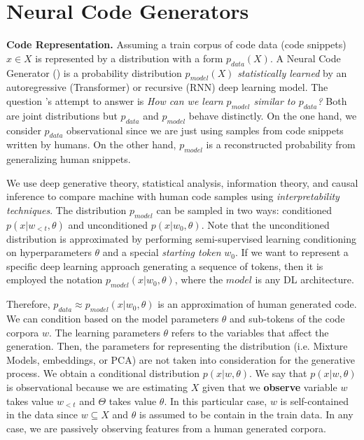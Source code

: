 \section{Neural Code Generators}
\label{sec:ncg}

\textbf{Code Representation.} Assuming a train corpus of code data (\eg code snippets) $x \in X$ is represented by a distribution with a form $p_{data}(X)$. A Neural Code Generator (\ncg) is a probability distribution $p_{model}(X)$ \textit{statistically learned} by an autoregressive (\ie Transformer) or recursive (\ie RNN) deep learning model. The question \ncg's attempt to answer is \textit{How can we learn $p_{model}$ similar to $p_{data}$?} Both are joint distributions but $p_{data}$ and $p_{model}$ behave distinctly. On the one hand, we consider $p_{data}$ observational since we are just using samples from code snippets written by humans. On the other hand, $p_{model}$ is a reconstructed probability from generalizing human snippets. 

We use deep generative theory, statistical analysis, information theory, and causal inference to compare machine with human code samples using \textit{interpretability techniques}. The distribution $p_{model}$ can be sampled in two ways: conditioned $p(x|w_{<t},\theta)$ and unconditioned  $p(x|w_0,\theta)$. Note that the unconditioned distribution is approximated by performing semi-supervised learning conditioning on hyperparameters $\theta$ and a special \textit{starting token} $w_0$. If we want to represent a specific deep learning approach generating a sequence of tokens, then it is employed the notation $p_{model}(x|w_0, \theta)$, where the $model$ is any DL architecture. 

Therefore, $p_{data} \approx p_{model}(x|w_0, \theta)$ is an approximation of human generated code. We can condition based on the model parameters $\theta$ and sub-tokens of the code corpora $w$. The learning parameters $\theta$ refers to the variables that affect the generation. Then, the parameters for representing the distribution (i.e. Mixture Models, embeddings, or PCA) are not taken into consideration for the generative process. We obtain a conditional distribution $p(x|w,\theta)$. We say that $p(x|w,\theta)$ is observational because we are estimating $X$ given that we \textbf{observe} variable $w$ takes value $w_{<t}$ and $\Theta$ takes value $\theta$. In this particular case, $w$ is self-contained in the data since $w \subseteq X$ and $\theta$ is assumed to be contain in the train data. In any case, we are passively observing features from a human generated corpora. 

